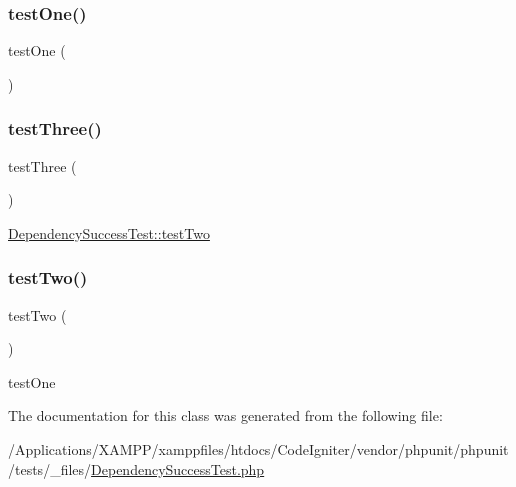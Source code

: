 \subsubsection{\texorpdfstring{test\+One()}{testOne()}}
{\footnotesize\ttfamily test\+One (\begin{DoxyParamCaption}{ }\end{DoxyParamCaption})}

\mbox{\label{class_dependency_success_test_a0bd6c752e665cd0e690512ca38d15d41}} 
\subsubsection{\texorpdfstring{test\+Three()}{testThree()}}
{\footnotesize\ttfamily test\+Three (\begin{DoxyParamCaption}{ }\end{DoxyParamCaption})}

\mbox{\hyperlink{class_dependency_success_test_a4fb9974ce113d5d1db8075e0db0dc9b6}{Dependency\+Success\+Test\+::test\+Two}} \mbox{\label{class_dependency_success_test_a4fb9974ce113d5d1db8075e0db0dc9b6}} 
\subsubsection{\texorpdfstring{test\+Two()}{testTwo()}}
{\footnotesize\ttfamily test\+Two (\begin{DoxyParamCaption}{ }\end{DoxyParamCaption})}

test\+One 

The documentation for this class was generated from the following file\+:\begin{DoxyCompactItemize}
\item 
/\+Applications/\+X\+A\+M\+P\+P/xamppfiles/htdocs/\+Code\+Igniter/vendor/phpunit/phpunit/tests/\+\_\+files/\mbox{\hyperlink{_dependency_success_test_8php}{Dependency\+Success\+Test.\+php}}\end{DoxyCompactItemize}
